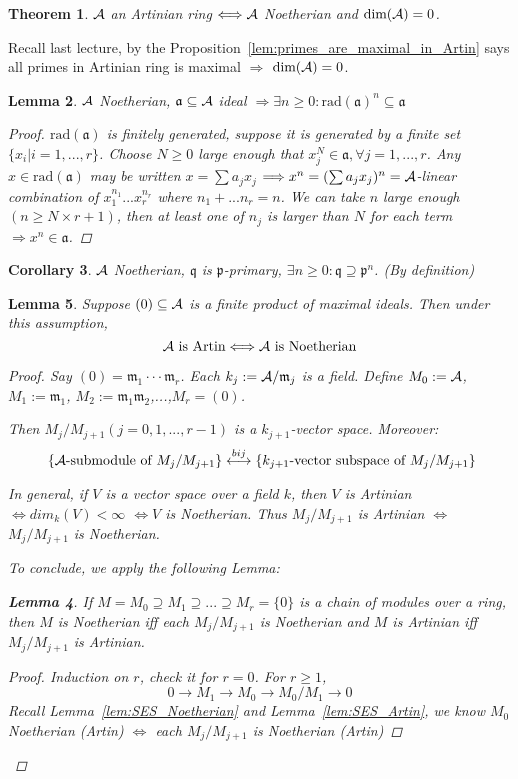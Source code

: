 \documentclass[11pt]{article}
\newtheorem{thm}{Theorem}[section]
\newtheorem{lemma}[thm]{Lemma}
\newtheorem{cor}[thm]{Corollary}
\newcommand{\sca}{{\mathfrak a}}
\newcommand{\scm}{{\mathfrak m}}
\newcommand{\scp}{{\mathfrak p}}
\newcommand{\scq}{\mathfrak q}
\newcommand{\cala}{{\cal A}}
\newcommand{\Lrta}{\Longrightarrow}
\newcommand{\lrta}{\longrightarrow}
\newcommand{\llrta}{\longleftrightarrow}
\newcommand{\Llrta}{\Longleftrightarrow}
\begin{document}
\begin{thm}\label{thm:Artin_equiv_Noetherin+dim=0}
$\cala$ an Artinian   ring $\Llrta\cala$ Noetherian and $\text{dim}(\cala)=0$.  
\end{thm}
Recall last lecture, by the Proposition~\ref{lem:primes_are_maximal_in_Artin} says all primes in Artinian   ring is maximal $\Lrta$ $\text{dim}(\cala)=0$.

\begin{lemma}\label{lem:ideal_radical_Noetherian}
$\cala$ Noetherian, $\sca\subseteq \cala$ ideal $\Lrta \exists n\geq 0: \text{rad}(\sca)^n\subseteq \sca$
\begin{proof}
$\text{rad}(\sca)$ is finitely generated, suppose it is generated by a finite set $\{x_i|i=1,...,r\}$. Choose $N\geq 0$ large enough that $x_j^N\in\sca,\forall j=1,...,r$. Any $x\in \text{rad}(\sca)$ may be written $x=\sum a_j x_j$ $\Lrta x^n=(\sum a_j x_j)^n=\cala$-linear combination of $x_1^{n_1}...x_r^{n_r} $ where $n_1+...n_r=n$. We can take $n$ large enough $(n\geq N\times r+1)$, then at least one of $n_j$ is larger than $N$ for each term $\Lrta x^n\in\sca$.
\end{proof}
\end{lemma}

\begin{cor}
$\cala$ Noetherian, $\scq$  is $\scp$-primary, $\exists n\geq 0:\scq\supseteq \scp^n$. (By definition)
\end{cor}

\begin{lemma}\label{lem:Artin_Noetherin_product_of_maximals}
Suppose $(0)\subseteq \cala$ is a finite product of maximal ideals. Then under this assumption, 
$$
\cala\text{ is Artin}\Llrta \cala\text{ is Noetherian}
$$
\begin{proof}
Say $(0)=\scm_1\cdot \cdot \cdot \scm_r$. Each $k_j:=\cala/\scm_j$ is a field. Define $M_0:=\cala$, $M_1:=\scm_1$, $M_2:=\scm_1\scm_2$,...,$M_r=(0)$.

Then $M_j/M_{j+1} (j=0,1,...,r-1)$ is a $k_{j+1}$-vector space. Moreover: 
$$
\text{
\{$\cala$-submodule of $M_j/M_{j+1}$\}}
\overset{bij}{\llrta}
\text{\{$k_{j+1}$-vector subspace of $M_j/M_{j+1}$\}}
$$

In general, if $V$ is a vector space over a field $k$, then $V$ is Artinian   $\Llrta dim_k(V)<\infty$ $\Llrta V$ is Noetherian. Thus $M_j/M_{j+1}$ is Artinian   $\Llrta$ $M_j/M_{j+1}$ is Noetherian.

To conclude, we apply the following Lemma:
\begin{lemma}
If $M=M_0\supseteq M_1\supseteq ...\supseteq M_r=\{0\}$ is a chain of modules over a ring, then $M$ is Noetherian iff each $M_j/M_{j+1}$ is Noetherian and $M$ is Artinian   iff $M_j/M_{j+1}$ is Artinian. 
\begin{proof}
Induction on $r$, check it for $r=0$.
For $r\geq 1$, 
$$
0\lrta M_1\lrta M_0\lrta M_0/M_1\lrta 0
$$ Recall Lemma~\ref{lem:SES_Noetherian} and Lemma~\ref{lem:SES_Artin}, we know $M_0$ Noetherian (Artin) $\Llrta$ each $M_j/M_{j+1}$ is Noetherian (Artin)
\end{proof}
\end{lemma}
\end{proof}
\end{lemma}
\end{document}
